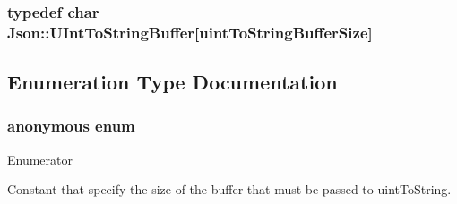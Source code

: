 \subsubsection[{\texorpdfstring{U\+Int\+To\+String\+Buffer}{UIntToStringBuffer}}]{\setlength{\rightskip}{0pt plus 5cm}typedef char Json\+::\+U\+Int\+To\+String\+Buffer\mbox{[}{\bf uint\+To\+String\+Buffer\+Size}\mbox{]}}\hypertarget{namespaceJson_a602bcf69c2042fb61c3b243cb16f04ca}{}\label{namespaceJson_a602bcf69c2042fb61c3b243cb16f04ca}


\subsection{Enumeration Type Documentation}
\subsubsection[{\texorpdfstring{anonymous enum}{anonymous enum}}]{\setlength{\rightskip}{0pt plus 5cm}anonymous enum}\hypertarget{namespaceJson_a0c5f614b019f20b4598dcaec09d9e820}{}\label{namespaceJson_a0c5f614b019f20b4598dcaec09d9e820}
\begin{Desc}
\item[Enumerator]\par
\begin{description}
\item[{\em 
uint\+To\+String\+Buffer\+Size\hypertarget{namespaceJson_a0c5f614b019f20b4598dcaec09d9e820ae4f2008c7919f20d81286121d1374424}{}\label{namespaceJson_a0c5f614b019f20b4598dcaec09d9e820ae4f2008c7919f20d81286121d1374424}
}]Constant that specify the size of the buffer that must be passed to uint\+To\+String. \end{description}
\end{Desc}
